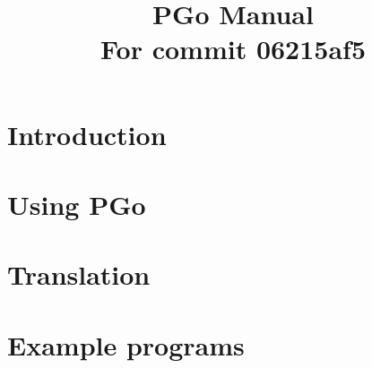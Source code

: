 \documentclass[notitlepage]{article}
\title{PGo Manual\\
	\normalsize{For commit 06215af5}}
\begin{document}
\maketitle

\section{Introduction}


\section{Using PGo}


\section{Translation}


\section{Example programs}

\end{document}
